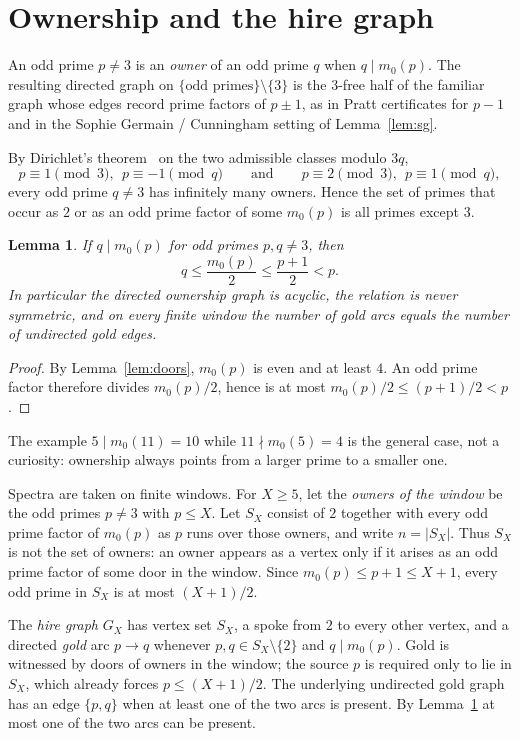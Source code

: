 \documentclass[11pt,a4paper]{article}
\newtheorem{lemma}{Lemma}
\begin{document}
\section{Ownership and the hire graph}

An odd prime \(p\neq 3\) is an \emph{owner} of an odd prime \(q\) when \(q\mid m_0(p)\).
The resulting directed graph on \(\{\text{odd primes}\}\setminus\{3\}\) is the 3-free half of the familiar graph whose edges record prime factors of \(p\pm 1\), as in Pratt certificates for \(p-1\)~\cite{Pratt} and in the Sophie Germain / Cunningham setting of Lemma~\ref{lem:sg}.

By Dirichlet's theorem~\cite{Dirichlet} on the two admissible classes modulo \(3q\),
\[
p\equiv 1\pmod{3},\ \ p\equiv -1\pmod{q}
\qquad\text{and}\qquad
p\equiv 2\pmod{3},\ \ p\equiv 1\pmod{q},
\]
every odd prime \(q\neq 3\) has infinitely many owners.
Hence the set of primes that occur as \(2\) or as an odd prime factor of some \(m_0(p)\) is all primes except \(3\).

\begin{lemma}
\label{lem:dag}
If \(q\mid m_0(p)\) for odd primes \(p,q\neq 3\), then
\[
q\le \frac{m_0(p)}{2}\le \frac{p+1}{2}<p.
\]
In particular the directed ownership graph is acyclic, the relation is never symmetric, and on every finite window the number of gold arcs equals the number of undirected gold edges.
\end{lemma}

\begin{proof}
By Lemma~\ref{lem:doors}, \(m_0(p)\) is even and at least \(4\).
An odd prime factor therefore divides \(m_0(p)/2\), hence is at most \(m_0(p)/2\le(p+1)/2<p\).
\end{proof}

The example \(5\mid m_0(11)=10\) while \(11\nmid m_0(5)=4\) is the general case, not a curiosity: ownership always points from a larger prime to a smaller one.

Spectra are taken on finite windows.
For \(X\ge 5\), let the \emph{owners of the window} be the odd primes \(p\neq 3\) with \(p\le X\).
Let \(S_X\) consist of \(2\) together with every odd prime factor of \(m_0(p)\) as \(p\) runs over those owners, and write \(n=|S_X|\).
Thus \(S_X\) is not the set of owners: an owner appears as a vertex only if it arises as an odd prime factor of some door in the window.
Since \(m_0(p)\le p+1\le X+1\), every odd prime in \(S_X\) is at most \((X+1)/2\).

The \emph{hire graph} \(G_X\) has vertex set \(S_X\), a spoke from \(2\) to every other vertex, and a directed \emph{gold} arc \(p\to q\) whenever \(p,q\in S_X\setminus\{2\}\) and \(q\mid m_0(p)\).
Gold is witnessed by doors of owners in the window; the source \(p\) is required only to lie in \(S_X\), which already forces \(p\le(X+1)/2\).
The underlying undirected gold graph has an edge \(\{p,q\}\) when at least one of the two arcs is present.
By Lemma~\ref{lem:dag} at most one of the two arcs can be present.
\end{document}
